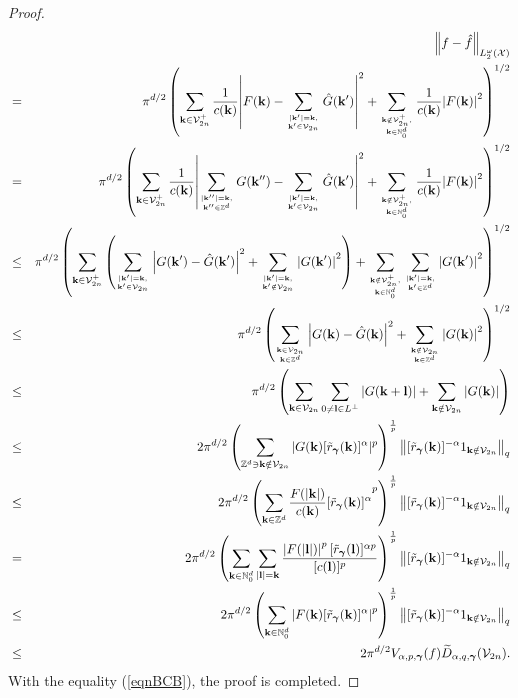 \documentclass[article]{siamltex}
\def\bk{{\bf k}}
\def\bl{{\bf l}}
\def\bgam{{\boldsymbol \gamma }}
\def\calV {\mathcal {V}}
\newcommand{\norm}[1]{\left\Vert#1\right\Vert}
\newcommand{\Z}{{\mathbb Z}}
\newcommand{\N}{\mathbb{N}}
\newcommand{\dsum}{\displaystyle\sum}
\newcommand{\abs}[1]{\left\vert#1\right\vert}
\begin{document}
\begin{proof}
\begin{eqnarray}
&&\norm{f-\hat{f}}_{L_2^{\omega}(\mathcal X)}\\
& =& \pi^{d/2}\left(\dsum_{\bk\in{\calV}_{2n}^+}\frac{1}{c(\bk)}{{\abs{F(\bk)-\sum_{|\bk'|=\bk,\atop\bk'\in {\calV}_{2n}}\hat{G}(\bk')}}^2}
+ \dsum_{\bk\notin{\calV}_{2n}^+,\atop \bk \in
{\N}^d_{0}}\frac{1}{c(\bk)}{\abs{F(\bk)}^2}\right)^{1/2}\nonumber\\
& =& \pi^{d/2}\left(\dsum_{\bk\in{\calV}_{2n}^+}\frac{1}{c(\bk)}{{\abs{\sum_{|\bk''|=\bk,\atop\bk''\in {\Z}^d}G(\bk'')-\sum_{|\bk'|=\bk,\atop\bk'\in {\calV}_{2n}}\hat{G}(\bk')}}^2}
+ \dsum_{\bk\notin{\calV}_{2n}^+,\atop \bk \in
{\N}^d_{0}}\frac{1}{c(\bk)}{\abs{F(\bk)}^2}\right)^{1/2}\nonumber\\
& \leq& \pi^{d/2}\left(\dsum_{\bk\in{\calV}_{2n}^+}\left(\dsum_{|\bk'|=\bk,\atop\bk'\in {\calV}_{2n}}\abs{G(\bk')-\hat{G}(\bk')}^2
+\sum_{|\bk'|=\bk,\atop\bk'\notin {\calV}_{2n}}\abs{{G}(\bk')}^2\right)+ \dsum_{\bk\notin{\calV}_{2n}^+,\atop \bk \in
{\N}^d_{0}}\dsum_{|\bk'|=\bk,\atop\bk'\in {\Z}^d}{\abs{G(\bk')}^2}\right)^{1/2}\nonumber\\
& \leq& \pi^{d/2}\left(\dsum_{\bk\in{\calV}_{2n}\atop\bk\in {\Z}^d}\abs{G(\bk)-\hat{G}(\bk)}^2
+\sum_{\bk\notin {\calV}_{2n}\atop\bk\in {\Z}^d}\abs{{G}(\bk)}^2\right)^{1/2}\nonumber\\
& \leq& \pi^{d/2}\left(\dsum_{\bk\in{\calV}_{2n}}\dsum_{0\neq\bl\in
L^\bot} \abs{G(\bk+\bl)} +
\dsum_{\bk\notin{\calV}_{2n}} \abs{G(\bk)}\right)\nonumber\\
&\leq& 2\pi^{d/2}
\left(\dsum_{{\Z}^d \ni \bk\notin{\calV}_{2n}} |G(\bk)[\tilde{r}_\bgam(\bk)]^{\alpha}|^p\right)^{\frac{1}{p}}
\norm{[\tilde{r}_\bgam(\bk)]^{-\alpha}1_{{\bk\notin
{\calV}_{2n}}}}_q\nonumber\\
&\le&  2\pi^{d/2}\left(\dsum_{\bk\in{\Z}^d} {\frac{F(|\bk|)}{c(\bk)}[\tilde{r}_\bgam(\bk)]^{\alpha}}^p\right)^{\frac{1}{p}}
\norm{[\tilde{r}_\bgam(\bk)]^{-\alpha}1_{{\bk\notin
{\calV}_{2n}}}}_q\nonumber\\
&=&  2\pi^{d/2}\left(\dsum_{\bk\in{\N}^d_0} \dsum_{|\bl|=\bk}\frac{\abs{F(|\bl|)}^p[\tilde{r}_\bgam(\bl)]^{\alpha p}}{[c(\bl)]^p}\right)^{\frac{1}{p}}
\norm{[\tilde{r}_\bgam(\bk)]^{-\alpha}1_{{\bk\notin
{\calV}_{2n}}}}_q\nonumber\\
&\leq&  2\pi^{d/2}\left(\dsum_{\bk\in{\N}^d_{0}} \abs{{F(\bk)}[\tilde{r}_\bgam(\bk)]^{\alpha}}^p\right)^{\frac{1}{p}}
\norm{[\tilde{r}_\bgam(\bk)]^{-\alpha}1_{{\bk\notin
{\calV}_{2n}}}}_q\nonumber\\
& \leq &
2\pi^{d/2}
  V_{\alpha,p,\bgam}(f)\widetilde{D}_{\alpha ,q,\bgam}(\calV_{2n}).
\end{eqnarray}
With the equality (\ref{eqnBCB}), the proof is
completed.\end{proof}
\end{document}
